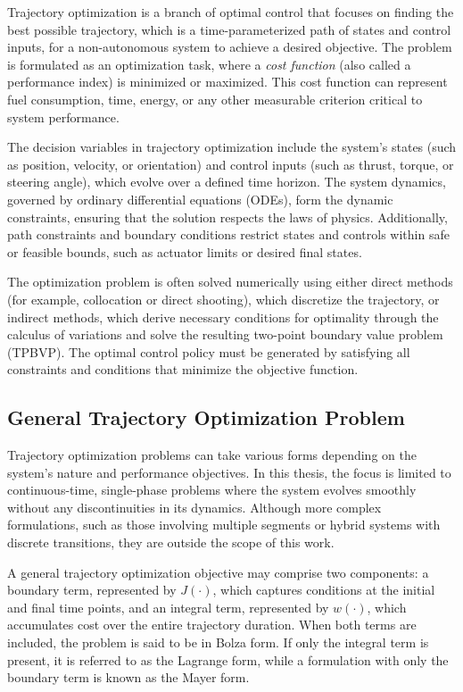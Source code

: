 \documentclass[
  number,
  preprint]{elsarticle}
\begin{document}
Trajectory optimization is a branch of optimal control that focuses on
finding the best possible trajectory, which is a time-parameterized path
of states and control inputs, for a non-autonomous system to achieve a
desired objective. The problem is formulated as an optimization task,
where a \emph{cost function} (also called a performance index) is
minimized or maximized. This cost function can represent fuel
consumption, time, energy, or any other measurable criterion critical to
system performance.

The decision variables in trajectory optimization include the system's
states (such as position, velocity, or orientation) and control inputs
(such as thrust, torque, or steering angle), which evolve over a defined
time horizon. The system dynamics, governed by ordinary differential
equations (ODEs), form the dynamic constraints, ensuring that the
solution respects the laws of physics. Additionally, path constraints
and boundary conditions restrict states and controls within safe or
feasible bounds, such as actuator limits or desired final states.

The optimization problem is often solved numerically using either direct
methods (for example, collocation or direct shooting), which discretize
the trajectory, or indirect methods, which derive necessary conditions
for optimality through the calculus of variations and solve the
resulting two-point boundary value problem (TPBVP). The optimal control
policy must be generated by satisfying all constraints and conditions
that minimize the objective function.

\subsection{General Trajectory Optimization
Problem}\label{general-trajectory-optimization-problem}

Trajectory optimization problems can take various forms depending on the
system's nature and performance objectives. In this thesis, the focus is
limited to continuous-time, single-phase problems where the system
evolves smoothly without any discontinuities in its dynamics. Although
more complex formulations, such as those involving multiple segments or
hybrid systems with discrete transitions, they are outside the scope of
this work.

A general trajectory optimization objective may comprise two components:
a boundary term, represented by \(J(\cdot)\), which captures conditions
at the initial and final time points, and an integral term, represented
by \(w(\cdot)\), which accumulates cost over the entire trajectory
duration. When both terms are included, the problem is said to be in
Bolza form. If only the integral term is present, it is referred to as
the Lagrange form, while a formulation with only the boundary term is
known as the Mayer form.
\end{document}
